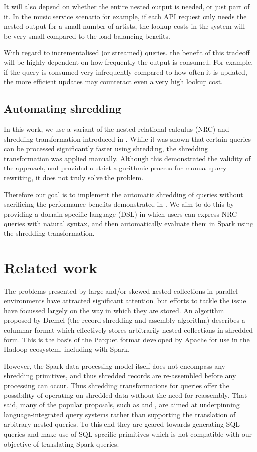 {It will also depend on whether the entire nested output is needed, or just part of it. In the music service scenario for example, if each API request only needs the nested output for a small number of artists, the lookup costs in the system will be very small compared to the load-balancing benefits.

With regard to incrementalised (or streamed) queries, the benefit of this tradeoff will be highly dependent on how frequently the output is consumed. For example, if the query is consumed very infrequently compared to how often it is updated, the more efficient updates may counteract even a very high lookup cost.

\subsection{Automating shredding} {
In this work, we use a variant of the nested relational calculus (NRC) and shredding transformation introduced in \cite{draftpaper}. While it was shown that certain queries can be processed significantly faster using shredding, the shredding transformation was applied manually. Although this demonstrated the validity of the approach, and provided a strict algorithmic process for manual query-rewriting, it does not truly solve the problem.

Therefore our goal is to implement the automatic shredding of queries without sacrificing the performance benefits demonstrated in \cite{draftpaper}. We aim to do this by providing a domain-specific language (DSL) in which users can express NRC queries with natural syntax, and then automatically evaluate them in Spark using the shredding transformation.
}

\section{Related work} {
The problems presented by large and/or skewed nested collections in parallel environments have attracted significant attention, but efforts to tackle the issue have focussed largely on the way in which they are stored. An algorithm proposed by Dremel \cite{melnik2010dremel} (the record shredding and assembly algorithm) describes a columnar format which effectively stores arbitrarily nested collections in shredded form. This is the basis of the Parquet format \cite{parquet} developed by Apache for use in the Hadoop ecosystem, including with Spark.

However, the Spark data processing model itself does not encompass any shredding primitives, and thus shredded records are re-assembled before any processing can occur. Thus shredding transformations for queries offer the possibility of operating on shredded data without the need for reassembly. That said, many of the popular proposals, such as \cite{grust2009ferry} and \cite{lindley2012row}, are aimed at underpinning language-integrated query systems rather than supporting the translation of arbitrary nested queries. To this end they are geared towards generating SQL queries and make use of SQL-specific primitives which is not compatible with our objective of translating Spark queries.

}}
